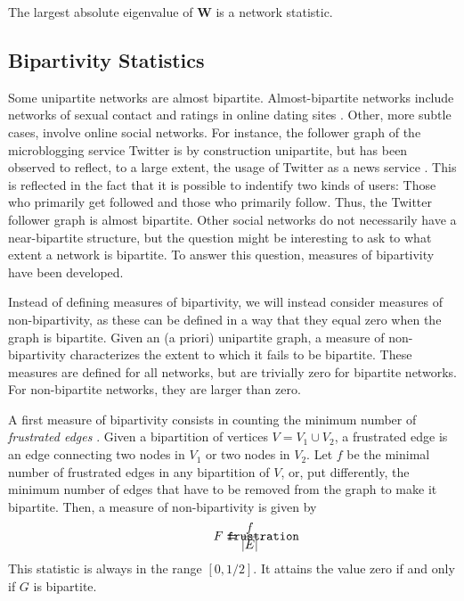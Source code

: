 \documentclass{article}
\def\mathnote#1{%
  \tag*{\rlap{\hspace\marginparsep\smash{\parbox[t]{\marginparwidth}{#1}}}}
}
\begin{document}
The largest absolute eigenvalue of $\mathbf W$ is a network statistic.

\subsection{Bipartivity Statistics}
Some unipartite networks are almost bipartite.  Almost-bipartite
networks include networks of sexual contact \citep{b719} and ratings in
online dating sites \citep{b311,kunegis:split-complex-dating}.  Other,
more subtle cases, involve online social networks.  For instance, the
follower graph of the microblogging service Twitter is by construction
unipartite, but has been observed to reflect, to a large extent, the
usage of Twitter as a news service \citep{b545}. This is reflected in the
fact that it is possible to indentify two kinds of users: Those who
primarily get followed and those who primarily follow.  Thus, the
Twitter follower graph is almost bipartite.  Other social networks do
not necessarily have a near-bipartite structure, but the question might
be interesting to ask to what extent a network is bipartite.  To answer
this question, measures of bipartivity have been developed.

Instead of defining measures of bipartivity, we will instead consider
measures of non-bipartivity, as these can be defined in a way that they
equal zero when the graph is bipartite.  Given an (a priori) unipartite
graph, a measure of non-bipartivity characterizes the extent to which it
fails to be bipartite.  These measures are defined for all networks, but
are trivially zero for bipartite networks.  For non-bipartite networks,
they are larger than zero.

A first measure of bipartivity consists in counting the minimum number
of \emph{frustrated edges} \citep{b531}. Given a bipartition of vertices
$V=V_1\cup V_2$, a frustrated edge is an edge connecting two nodes in
$V_1$ or two nodes in $V_2$.  Let $f$ be the minimal number of
frustrated edges in any bipartition of $V$, or, put differently, the
minimum number of edges that have to be removed from the graph to make
it bipartite.  Then, a measure of non-bipartivity is given by
\begin{align}
  \mathnote{\texttt{frustration}} F &= \frac f {|E|}.
\end{align}
This statistic is always in the range $[0, 1/2]$.  It attains the value
zero if and only if $G$ is bipartite.
\end{document}
